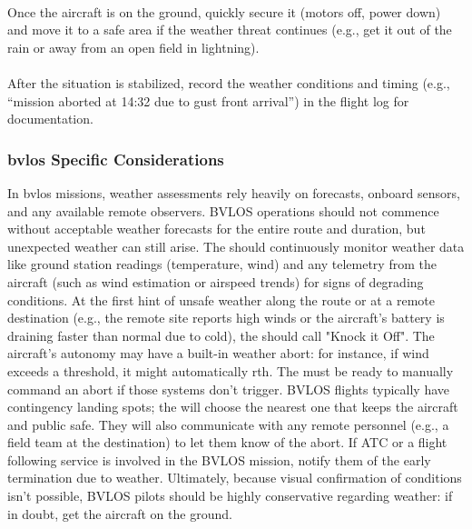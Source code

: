                 \paragraph{} Once the aircraft is on the ground, quickly secure it (motors off, power down) and move it to a safe area if the weather threat continues (e.g., get it out of the rain or away from an open field in lightning).
                \paragraph{} After the situation is stabilized, record the weather conditions and timing (e.g., “mission aborted at 14:32 due to gust front arrival”) in the flight log for documentation.
            
            \subsubsection{\ac{bvlos} Specific Considerations} In \ac{bvlos} missions, weather assessments rely heavily on forecasts, onboard sensors, and any available remote observers. BVLOS operations should not commence without acceptable weather forecasts for the entire route and duration, but unexpected weather can still arise. The  should continuously monitor weather data like ground station readings (temperature, wind) and any telemetry from the aircraft (such as wind estimation or airspeed trends) for signs of degrading conditions. At the first hint of unsafe weather along the route or at a remote destination (e.g., the remote site reports high winds or the aircraft’s battery is draining faster than normal due to cold), the  should call "Knock it Off". The aircraft’s autonomy may have a built-in weather abort: for instance, if wind exceeds a threshold, it might automatically \ac{rth}. The  must be ready to manually command an abort if those systems don’t trigger. BVLOS flights typically have contingency landing spots; the  will choose the nearest one that keeps the aircraft and public safe. They will also communicate with any remote personnel (e.g., a field team at the destination) to let them know of the abort. If ATC or a flight following service is involved in the BVLOS mission, notify them of the early termination due to weather. Ultimately, because visual confirmation of conditions isn’t possible, BVLOS pilots should be highly conservative regarding weather: if in doubt, get the aircraft on the ground.
            
